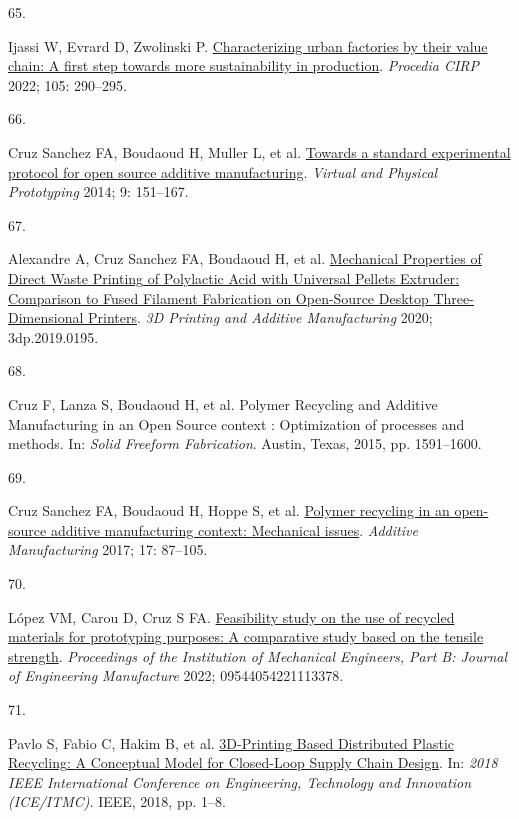 \documentclass[
  11pt,
  a4paperpaper,
  onecolumn]{article}
\newlength{\cslhangindent}
\newlength{\csllabelwidth}
\newlength{\cslentryspacingunit} %
\newenvironment{CSLReferences}[2] %
 {%
  \setlength{\parindent}{0pt}
  \ifodd #1
  \let\oldpar\par
  \def\par{\hangindent=\cslhangindent\oldpar}
  \fi
  \setlength{\parskip}{#2\cslentryspacingunit}
 }%
 {}
\newcommand{\CSLLeftMargin}[1]{\parbox[t]{\csllabelwidth}{#1}}
\newcommand{\CSLRightInline}[1]{\parbox[t]{\linewidth - \csllabelwidth}{#1}\break}
\begin{document}
\begin{CSLReferences}{0}{0}
\leavevmode{}%
\CSLLeftMargin{65. }%
\CSLRightInline{Ijassi W, Evrard D, Zwolinski P.
\href{https://doi.org/10.1016/j.procir.2022.02.048}{Characterizing urban
factories by their value chain: A first step towards more sustainability
in production}. \emph{Procedia CIRP} 2022; 105: 290--295.}

\leavevmode{}%
\CSLLeftMargin{66. }%
\CSLRightInline{Cruz Sanchez FA, Boudaoud H, Muller L, et al.
\href{https://doi.org/10.1080/17452759.2014.919553}{Towards a standard
experimental protocol for open source additive manufacturing}.
\emph{Virtual and Physical Prototyping} 2014; 9: 151--167.}

\leavevmode{}%
\CSLLeftMargin{67. }%
\CSLRightInline{Alexandre A, Cruz Sanchez FA, Boudaoud H, et al.
\href{https://doi.org/10.1089/3dp.2019.0195}{Mechanical {Properties} of
{Direct Waste Printing} of {Polylactic Acid} with {Universal Pellets
Extruder}: {Comparison} to {Fused Filament Fabrication} on {Open-Source
Desktop Three-Dimensional Printers}}. \emph{3D Printing and Additive
Manufacturing} 2020; 3dp.2019.0195.}

\leavevmode{}%
\CSLLeftMargin{68. }%
\CSLRightInline{Cruz F, Lanza S, Boudaoud H, et al. Polymer {Recycling}
and {Additive Manufacturing} in an {Open Source} context :
{Optimization} of processes and methods. In: \emph{Solid {Freeform
Fabrication}}. {Austin, Texas}, 2015, pp. 1591--1600.}

\leavevmode{}%
\CSLLeftMargin{69. }%
\CSLRightInline{Cruz Sanchez FA, Boudaoud H, Hoppe S, et al.
\href{https://doi.org/10.1016/j.addma.2017.05.013}{Polymer recycling in
an open-source additive manufacturing context: {Mechanical} issues}.
\emph{Additive Manufacturing} 2017; 17: 87--105.}

\leavevmode{}%
\CSLLeftMargin{70. }%
\CSLRightInline{López VM, Carou D, Cruz S FA.
\href{https://doi.org/10.1177/09544054221113378}{Feasibility study on
the use of recycled materials for prototyping purposes: {A} comparative
study based on the tensile strength}. \emph{Proceedings of the
Institution of Mechanical Engineers, Part B: Journal of Engineering
Manufacture} 2022; 09544054221113378.}

\leavevmode{}%
\CSLLeftMargin{71. }%
\CSLRightInline{Pavlo S, Fabio C, Hakim B, et al.
\href{https://doi.org/10.1109/ICE.2018.8436296}{{3D-Printing Based
Distributed Plastic Recycling}: {A Conceptual Model} for {Closed-Loop
Supply Chain Design}}. In: \emph{2018 {IEEE International Conference} on
{Engineering}, {Technology} and {Innovation} ({ICE}/{ITMC})}. {IEEE},
2018, pp. 1--8.}


\end{CSLReferences}
\end{document}
